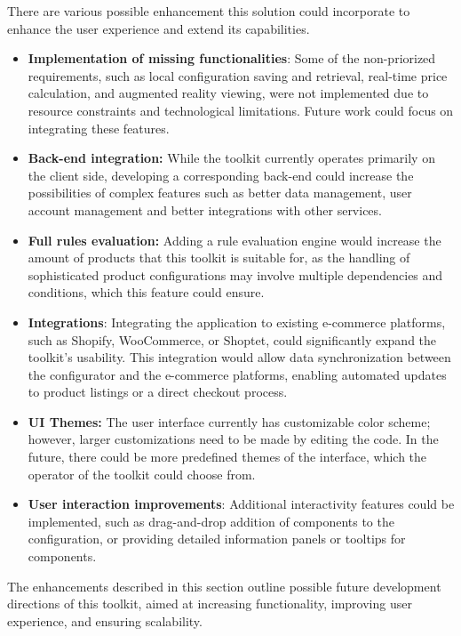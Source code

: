 There are various possible enhancement this solution could incorporate to enhance the user experience and extend its capabilities.

\begin{itemize}[label=\rectanglebullet]
    \item \textbf{Implementation of missing functionalities}: Some of the non-priorized requirements, such as local configuration saving and retrieval, real-time price calculation, and augmented reality viewing, were not implemented due to resource constraints and technological limitations. Future work could focus on integrating these features.
    \item \textbf{Back-end integration:} While the toolkit currently operates primarily on the client side, developing a corresponding back-end could increase the possibilities of complex features such as better data management, user account management and better integrations with other services.
    \item \textbf{Full rules evaluation:} Adding a rule evaluation engine would increase the amount of products that this toolkit is suitable for, as the handling of sophisticated product configurations may involve multiple dependencies and conditions, which this feature could ensure.
    \item \textbf{Integrations}: Integrating the application to existing e-commerce platforms, such as Shopify, WooCommerce, or Shoptet, could significantly expand the toolkit's usability. This integration would allow data synchronization between the configurator and the e-commerce platforms, enabling automated updates to product listings or a direct checkout process.
    \item \textbf{UI Themes:} The user interface currently has customizable color scheme; however, larger customizations need to be made by editing the  code. In the future, there could be more predefined themes of the interface, which the operator of the toolkit could choose from.
    \item \textbf{User interaction improvements}: Additional interactivity features could be implemented, such as drag-and-drop addition of components to the configuration, or providing detailed information panels or tooltips for components.
\end{itemize}

The enhancements described in this section outline possible future development directions of this toolkit, aimed at increasing functionality, improving user experience, and ensuring scalability.